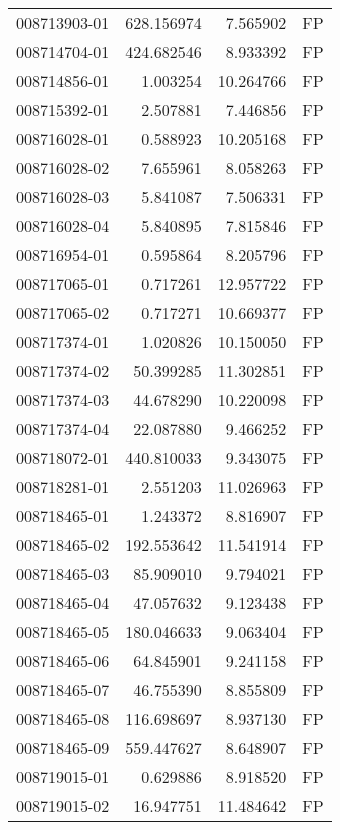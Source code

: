\begin{tabular}{lrrl}
008713903-01 &  628.156974 &       7.565902 &   FP \\
008714704-01 &  424.682546 &       8.933392 &   FP \\
008714856-01 &    1.003254 &      10.264766 &   FP \\
008715392-01 &    2.507881 &       7.446856 &   FP \\
008716028-01 &    0.588923 &      10.205168 &   FP \\
008716028-02 &    7.655961 &       8.058263 &   FP \\
008716028-03 &    5.841087 &       7.506331 &   FP \\
008716028-04 &    5.840895 &       7.815846 &   FP \\
008716954-01 &    0.595864 &       8.205796 &   FP \\
008717065-01 &    0.717261 &      12.957722 &   FP \\
008717065-02 &    0.717271 &      10.669377 &   FP \\
008717374-01 &    1.020826 &      10.150050 &   FP \\
008717374-02 &   50.399285 &      11.302851 &   FP \\
008717374-03 &   44.678290 &      10.220098 &   FP \\
008717374-04 &   22.087880 &       9.466252 &   FP \\
008718072-01 &  440.810033 &       9.343075 &   FP \\
008718281-01 &    2.551203 &      11.026963 &   FP \\
008718465-01 &    1.243372 &       8.816907 &   FP \\
008718465-02 &  192.553642 &      11.541914 &   FP \\
008718465-03 &   85.909010 &       9.794021 &   FP \\
008718465-04 &   47.057632 &       9.123438 &   FP \\
008718465-05 &  180.046633 &       9.063404 &   FP \\
008718465-06 &   64.845901 &       9.241158 &   FP \\
008718465-07 &   46.755390 &       8.855809 &   FP \\
008718465-08 &  116.698697 &       8.937130 &   FP \\
008718465-09 &  559.447627 &       8.648907 &   FP \\
008719015-01 &    0.629886 &       8.918520 &   FP \\
008719015-02 &   16.947751 &      11.484642 &   FP \\

\end{tabular}
